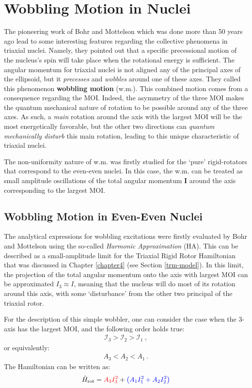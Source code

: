 \chapter{Wobbling Motion in Nuclei}

The pioneering work of Bohr and Mottelson \cite{bohr1998nuclear} which was done more than 50 years ago lead to some interesting features regarding the collective phenomena in triaxial nuclei. Namely, they pointed out that a specific precessional motion of the nucleus's spin will take place when the rotational energy is sufficient. The angular momentum for triaxial nuclei is not aligned any of the principal axes of the ellipsoid, but it \emph{precesses} and \emph{wobbles} around one of these axes. They called this phenomenon \textbf{wobbling motion} (w.m.).
This combined motion comes from a consequence regarding the MOI. Indeed, the asymmetry of the three MOI makes the quantum mechanical nature of rotation to be possible around any of the three axes. As such, a \emph{main} rotation around the axis with the largest MOI will be the most energetically favorable, but the other two directions can \emph{quantum mechanically disturb} this main rotation, leading to this unique characteristic of triaxial nuclei.

The non-uniformity nature of w.m. was firstly studied for the `pure' rigid-rotators that correspond to the even-even nuclei. In this case, the w.m. can be treated as small amplitude oscillations of the total angular momentum $\mathbf{I}$ around the axis corresponding to the largest MOI.

\section{Wobbling Motion in Even-Even Nuclei}

The analytical expressions for wobbling excitations were firstly evaluated by Bohr and Mottelson using the so-called \emph{Harmonic Approximation} (HA). This can be described as a small-amplitude limit for the Triaxial Rigid Rotor Hamiltonian that was discussed in Chapter \ref{chapter4} (see Section \ref{trm-model}). In this limit, the projection of the total angular momentum onto the axis with largest MOI can be approximated $I_3\approx I$, meaning that the nucleus will do most of its rotation around this axis, with some `disturbance' from the other two principal of the triaxial rotor. 

For the description of this simple wobbler, one can consider the case when the $3$-axis has the largest MOI, and the following order holds true:
\begin{align}
    \mathcal{I}_3>\mathcal{I}_2>\mathcal{I}_1\ ,
\end{align}
or equivalently:
\begin{align}
    A_3<A_2<A_1\ .
\end{align}
The Hamiltonian can be written as:
\begin{align}
    \hat{H}_\text{rot}={\color{red}A_3I_3^2}+{\color{blue}\left(A_1I_1^2+A_2I_2^2\right)}
    \label{general-rotor-ham-evenA}
\end{align}

